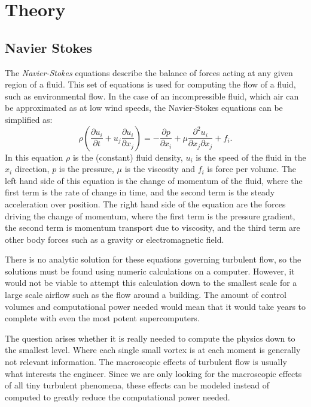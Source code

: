 \section{Theory}
\label{theory}


\subsection{Navier Stokes}

The \emph{Navier-Stokes} equations describe the balance of forces acting at any given region of a fluid. This set of equations is used for computing the flow of a fluid, such as environmental flow. In the case of an incompressible fluid, which air can be approximated as at low wind speeds, the Navier-Stokes equations can be simplified as:
\begin{equation}\label{eq:NS}
\rho \left( \frac{\partial u_i}{\partial t} + u_j \frac{\partial u_i}{\partial x_j} \right) = -\frac{\partial p}{\partial x_i} + \mu \frac{\partial^2 u_i}{\partial x_j \partial x_j} + f_i. 
\end{equation} 
In this equation $\rho$ is the (constant) fluid density, $u_i$ is the speed of the fluid in the $x_i$ direction, $p$ is the pressure, $\mu$ is the viscosity and $f_i$ is force per volume. The left hand side of this equation is the change of momentum of the fluid, where the first term is the rate of change in time, and the second term is the steady acceleration over position. The right hand side of the equation are the forces driving the change of momentum, where the first term is the pressure gradient, the second term is momentum transport due to viscosity, and the third term are other body forces such as a gravity or electromagnetic field.

There is no analytic solution for these equations governing turbulent flow, so the solutions must be found using numeric calculations on a computer. However, it would not be viable to attempt this calculation down to the smallest scale for a large scale airflow such as the flow around a building. The amount of control volumes and computational power needed would mean that it would take years to complete with even the most potent supercomputers. 

The question arises whether it is really needed to compute the physics down to the smallest level. Where each single small vortex is at each moment is generally not relevant information. The macroscopic effects of turbulent flow is usually what interests the engineer. Since we are only looking for the macroscopic effects of all tiny turbulent phenomena, these effects can be modeled instead of computed to greatly reduce the computational power needed. 

